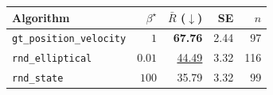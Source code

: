 \begin{tabular}{@{}>{\raggedright\arraybackslash}p{4.6cm} r r r r@{}}
\toprule
\textbf{Algorithm} & \textbf{$\beta^\star$} & \textbf{$\bar{R}$ ($\downarrow$)} & \textbf{SE} & \textbf{$n$} \\
\midrule
\texttt{gt\_position\_velocity} & $1$ & \textbf{67.76} & 2.44 & 97 \\
\texttt{rnd\_elliptical} & $0.01$ & \underline{44.49} & 3.32 & 116 \\
\texttt{rnd\_state} & $100$ & 35.79 & 3.32 & 99 \\
\bottomrule
\end{tabular}
